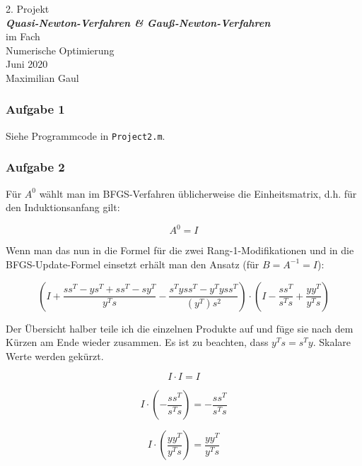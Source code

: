 \documentclass[a4paper, 12pt]{report}
\begin{document}
\begin{center}
    \vspace*{2em}
    \normalsize 2. Projekt\\
    \vspace*{1em}
    \normalsize \textbf{\textit{Quasi-Newton-Verfahren \& Gauß-Newton-Verfahren}}\\
    \vspace*{4em}
    \normalsize im Fach\\
    \vspace*{1em}
    \large Numerische Optimierung\\
    \vspace*{30em}
    \normalsize Juni 2020\\
    \vspace*{1em}
    \normalsize Maximilian Gaul
\end{center}

\thispagestyle{empty}

\newpage

\subsubsection{Aufgabe 1}
Siehe Programmcode in \lstinline[basicstyle=\ttfamily\color{black}]|Project2.m|.

\subsubsection{Aufgabe 2}
Für $A^0$ wählt man im BFGS-Verfahren üblicherweise die Einheitsmatrix, d.h. für den Induktionsanfang gilt:

$$A^0 = I$$

Wenn man das nun in die Formel für die zwei Rang-1-Modifikationen und in die BFGS-Update-Formel einsetzt erhält man den Ansatz
(für $B = A^{-1} = I$):

$$\left( I + \frac{ss^T - ys^T + ss^T - sy^T}{y^Ts} - \frac{s^Tyss^T - y^Tyss^T}{(y^T)s^2}\right)\cdot\left(I - \frac{ss^T}{s^Ts} + \frac{yy^T}{y^Ts} \right)$$

Der Übersicht halber teile ich die einzelnen Produkte auf und füge sie nach dem Kürzen am Ende wieder zusammen.
Es ist zu beachten, dass $y^Ts = s^Ty$. Skalare Werte werden gekürzt.

$$I\cdot I = I$$

$$I \cdot \left(-\frac{ss^T}{s^Ts}\right) = -\frac{ss^T}{s^Ts}$$

$$I\cdot \left(\frac{yy^T}{y^Ts}\right) = \frac{yy^T}{y^Ts}$$
\end{document}
